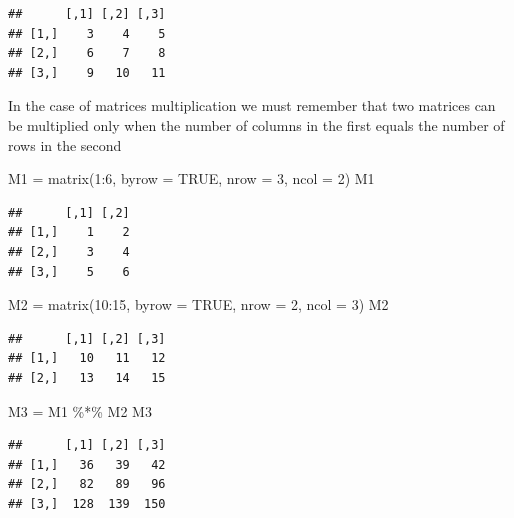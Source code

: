 \documentclass[
]{book}
\newenvironment{Shaded}{\begin{snugshade}}{\end{snugshade}}
\newcommand{\AttributeTok}[1]{\textcolor[rgb]{0.77,0.63,0.00}{#1}}
\newcommand{\ConstantTok}[1]{\textcolor[rgb]{0.00,0.00,0.00}{#1}}
\newcommand{\DecValTok}[1]{\textcolor[rgb]{0.00,0.00,0.81}{#1}}
\newcommand{\FunctionTok}[1]{\textcolor[rgb]{0.00,0.00,0.00}{#1}}
\newcommand{\NormalTok}[1]{#1}
\newcommand{\OtherTok}[1]{\textcolor[rgb]{0.56,0.35,0.01}{#1}}
\newcommand{\SpecialCharTok}[1]{\textcolor[rgb]{0.00,0.00,0.00}{#1}}
\theoremstyle{definition}
\theoremstyle{definition}
\theoremstyle{definition}
\theoremstyle{definition}
\theoremstyle{remark}
\begin{document}
\begin{verbatim}
##      [,1] [,2] [,3]
## [1,]    3    4    5
## [2,]    6    7    8
## [3,]    9   10   11
\end{verbatim}

In the case of matrices multiplication we must remember that two matrices can be multiplied only when the number of columns in the first equals the number of rows in the second

\begin{Shaded}
\begin{Highlighting}[]
\NormalTok{M1 }\OtherTok{=} \FunctionTok{matrix}\NormalTok{(}\DecValTok{1}\SpecialCharTok{:}\DecValTok{6}\NormalTok{, }\AttributeTok{byrow =} \ConstantTok{TRUE}\NormalTok{, }\AttributeTok{nrow =} \DecValTok{3}\NormalTok{, }\AttributeTok{ncol =} \DecValTok{2}\NormalTok{)}
\NormalTok{M1}
\end{Highlighting}
\end{Shaded}

\begin{verbatim}
##      [,1] [,2]
## [1,]    1    2
## [2,]    3    4
## [3,]    5    6
\end{verbatim}

\begin{Shaded}
\begin{Highlighting}[]
\NormalTok{M2 }\OtherTok{=} \FunctionTok{matrix}\NormalTok{(}\DecValTok{10}\SpecialCharTok{:}\DecValTok{15}\NormalTok{, }\AttributeTok{byrow =} \ConstantTok{TRUE}\NormalTok{, }\AttributeTok{nrow =} \DecValTok{2}\NormalTok{, }\AttributeTok{ncol =} \DecValTok{3}\NormalTok{)}
\NormalTok{M2}
\end{Highlighting}
\end{Shaded}

\begin{verbatim}
##      [,1] [,2] [,3]
## [1,]   10   11   12
## [2,]   13   14   15
\end{verbatim}

\begin{Shaded}
\begin{Highlighting}[]
\NormalTok{M3 }\OtherTok{=}\NormalTok{ M1 }\SpecialCharTok{\%*\%}\NormalTok{ M2}
\NormalTok{M3}
\end{Highlighting}
\end{Shaded}

\begin{verbatim}
##      [,1] [,2] [,3]
## [1,]   36   39   42
## [2,]   82   89   96
## [3,]  128  139  150
\end{verbatim}
\end{document}
